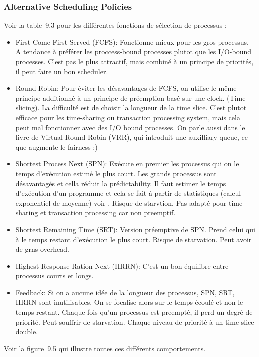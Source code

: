 \subsubsection{Alternative Scheduling Policies}
Voir la table~9.3 pour les différentes fonctions de sélection de processus :
\begin{itemize}
  \item First-Come-First-Served (FCFS): Fonctionne mieux pour les gros processus.
    A tendance à préférer les proccess-bound processes plutot que les I/O-bound processes.
    C'est pas le plus attractif, mais combiné à un principe de priorités, il peut faire un bon scheduler.
  \item Round Robin: Pour éviter les désavantages de FCFS, on utilise le même principe additionné à un principe de préemption basé sur une clock.
    (Time slicing).
    La difficulté est de choisir la longueur de la time slice.
    C'est plutot efficace pour les time-sharing ou transaction processing system, mais cela peut mal fonctionner avec des I/O bound processes.
    On parle aussi dans le livre de Virtual Round Robin (VRR), qui introduit une auxilliary queue, ce que augmente le fairness :)
  \item Shortest Process Next (SPN): Exécute en premier les processus qui on le temps d'exécution estimé le plus court.
    Les grands processus sont désavantagés et cella réduit la prédictability.
    Il faut estimer le temps d'exécution d'un programme et cela se fait à partir de statistiques (calcul exponentiel de moyenne) voir \cite[p.~410-411]{stallings}.
    Risque de starvtion.
    Pas adapté pour time-sharing et transaction processing car non preemptif.
  \item Shortest Remaining Time (SRT): Version préemptive de SPN.
    Prend celui qui à le temps restant d'exécution le plus court.
    Risque de starvation.
    Peut avoir de grns overhead.
  \item Highest Response Ration Next (HRRN): C'est un bon équilibre entre processus courts et longs.
  \item Feedback: Si on a aucune idée de la longueur des processus, SPN, SRT, HRRN sont inutilisables.
    On se focalise alors sur le temps écoulé et non le temps restant.
    Chaque fois qu'un processus est preempté, il perd un degré de priorité.
    Peut souffrir de starvation.
    Chaque niveau de priorité à un time slice double.
\end{itemize}
Voir la figure~9.5 \cite[p.~405]{stallings} qui illustre toutes ces différents comportements.

